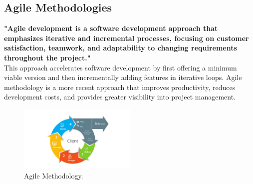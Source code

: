 \subsection{ Agile Methodologies}
\textbf{"Agile development is a software development approach that emphasizes iterative and incremental processes, focusing on customer satisfaction, teamwork, and adaptability to changing requirements throughout the project." \cite{somebook}}\\
This approach accelerates software development by first offering a minimum viable version and then incrementally adding features in iterative loops.
Agile methodology is a more recent approach that improves productivity, reduces development costs, and provides greater visibility into project management.
\begin{figure}[h]
    \centering
    \includegraphics[width=0.5\textwidth]{figures/agile.jpg} 
    \caption{Agile Methodology.}
\end{figure}\
\clearpage

